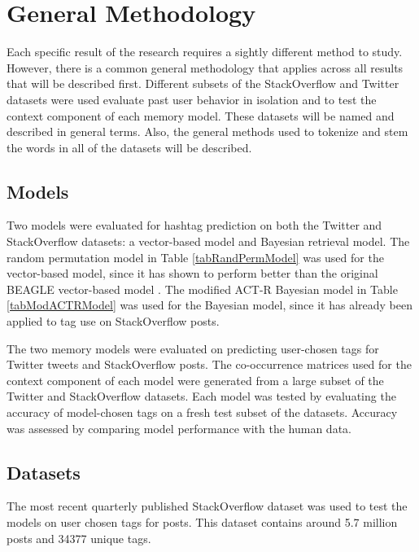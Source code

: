 \documentclass[man,donotrepeattitle]{apa6}
\begin{document}
\section{General Methodology}

Each specific result of the research requires a sightly different method to study.
However, there is a common general methodology that applies across all results that will be described first.
Different subsets of the StackOverflow and Twitter datasets were used evaluate past user behavior in isolation and to test the context component of each memory model.
These datasets will be named and described in general terms.
Also, the general methods used to tokenize and stem the words in all of the datasets will be described.

\subsection{Models}

Two models were evaluated for hashtag prediction on both the Twitter and StackOverflow datasets: a vector-based model and Bayesian retrieval model.
The random permutation model \parencite{Sahlgren2008} in Table \ref{tabRandPermModel} was used for the vector-based model,
since it has shown to perform better than the original BEAGLE vector-based model \parencite{Recchia2010}.
The modified ACT-R Bayesian model \parencite{Stanley2013} in Table \ref{tabModACTRModel} was used for the Bayesian model, since it has already been applied to tag use on StackOverflow posts.

The two memory models were evaluated on predicting user-chosen tags for Twitter tweets and StackOverflow posts.
The co-occurrence matrices used for the context component of each model were generated from a large subset of the Twitter and StackOverflow datasets.
Each model was tested by evaluating the accuracy of model-chosen tags on a fresh test subset of the datasets.
Accuracy was assessed by comparing model performance with the human data.

\subsection{Datasets}

The most recent quarterly published StackOverflow dataset \parencite{DataDump2014} was used to test the models on user chosen tags for posts.
This dataset contains around \num{5.7} million posts and \num{34377} unique tags.
\end{document}

